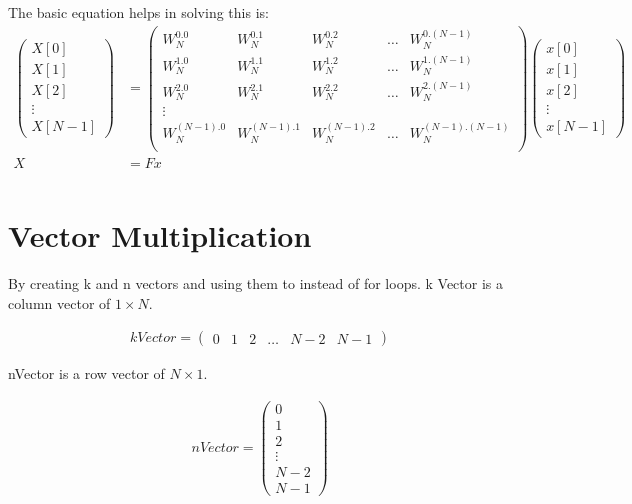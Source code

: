 \documentclass{article}
\begin{document}
The basic equation helps in solving this is:
\begin{align*}
    \begin{pmatrix}
        X[0]   \\
        X[1]   \\
        X[2]   \\
        \vdots \\
        X[N-1]
    \end{pmatrix}
      & = \begin{pmatrix}
        W_N^{0.0}     & W_N^{0.1}     & W_N^{0.2}     & \dots & W_N^{0.(N-1)}     \\
        W_N^{1.0}     & W_N^{1.1}     & W_N^{1.2}     & \dots & W_N^{1.(N-1)}     \\
        W_N^{2.0}     & W_N^{2.1}     & W_N^{2.2}     & \dots & W_N^{2.(N-1)}     \\
        \vdots                                                                    \\
        W_N^{(N-1).0} & W_N^{(N-1).1} & W_N^{(N-1).2} & \dots & W_N^{(N-1).(N-1)} \\
    \end{pmatrix}
    \begin{pmatrix}
        x[0]   \\
        x[1]   \\
        x[2]   \\
        \vdots \\
        x[N-1]
    \end{pmatrix}       \\
    X & = F x                       \\
\end{align*}

\section{Vector Multiplication}
By creating k and n vectors and using them to instead of for loops.
k Vector is a column vector of $1 \times N$.

\begin{align*}
    kVector = \begin{pmatrix}
        0 & 1 & 2 & \dots & N-2 & N-1
    \end{pmatrix}
\end{align*}

nVector is a row vector of $N \times 1$.

\begin{align*}
    nVector = \begin{pmatrix}
        0 \\ 1 \\ 2 \\ \vdots \\ N-2 \\ N-1
    \end{pmatrix}
\end{align*}
\end{document}
